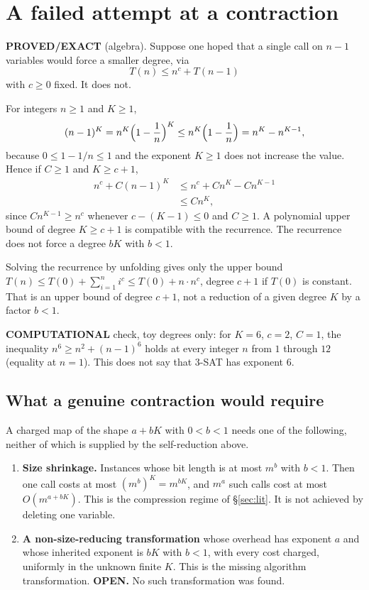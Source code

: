 \documentclass[11pt]{article}
\begin{document}
\section{A failed attempt at a contraction}
\label{sec:fail}

\textbf{PROVED/EXACT} (algebra). Suppose one hoped that a single call on $n-1$ variables would force a smaller degree, via
\[
T(n)\le n^{c}+T(n-1)
\]
with $c\ge 0$ fixed. It does not.

For integers $n\ge 1$ and $K\ge 1$,
\[
(n-1)^{K}=n^{K}\Bigl(1-\frac{1}{n}\Bigr)^{K}\le n^{K}\Bigl(1-\frac{1}{n}\Bigr)=n^{K}-n^{K-1},
\]
because $0\le 1-1/n\le 1$ and the exponent $K\ge 1$ does not increase the value. Hence if $C\ge 1$ and $K\ge c+1$,
\begin{align*}
n^{c}+C(n-1)^{K}
&\le n^{c}+C n^{K}-C n^{K-1} \\
&\le C n^{K},
\end{align*}
since $C n^{K-1}\ge n^{c}$ whenever $c-(K-1)\le 0$ and $C\ge 1$. A polynomial upper bound of degree $K\ge c+1$ is compatible with the recurrence. The recurrence does not force a degree $bK$ with $b<1$.

Solving the recurrence by unfolding gives only the upper bound $T(n)\le T(0)+\sum_{i=1}^{n} i^{c}\le T(0)+n\cdot n^{c}$, degree $c+1$ if $T(0)$ is constant. That is an upper bound of degree $c+1$, not a reduction of a given degree $K$ by a factor $b<1$.

\textbf{COMPUTATIONAL} check, toy degrees only: for $K=6$, $c=2$, $C=1$, the inequality $n^{6}\ge n^{2}+(n-1)^{6}$ holds at every integer $n$ from $1$ through $12$ (equality at $n=1$). This does not say that 3-SAT has exponent $6$.

\subsection*{What a genuine contraction would require}
A charged map of the shape $a+bK$ with $0<b<1$ needs one of the following, neither of which is supplied by the self-reduction above.
\begin{enumerate}
\item[(i)] \textbf{Size shrinkage.} Instances whose bit length is at most $m^{b}$ with $b<1$. Then one call costs at most $(m^{b})^{K}=m^{bK}$, and $m^{a}$ such calls cost at most $O(m^{a+bK})$. This is the compression regime of \S\ref{sec:lit}. It is not achieved by deleting one variable.
\item[(ii)] \textbf{A non-size-reducing transformation} whose overhead has exponent $a$ and whose inherited exponent is $bK$ with $b<1$, with every cost charged, uniformly in the unknown finite $K$. This is the missing algorithm transformation. \textbf{OPEN.} No such transformation was found.
\end{enumerate}
\end{document}
